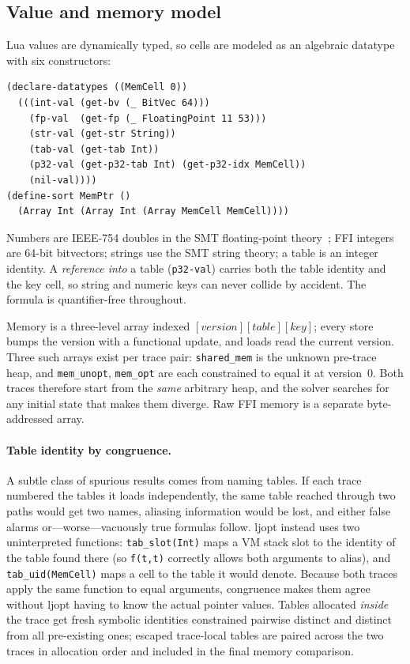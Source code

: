 \documentclass[runningheads]{llncs}
\newif\iffull \fulltrue
\newcommand{\ljopt}{\textsf{ljopt}}
\newcommand{\ir}[1]{\texttt{#1}}
\begin{document}
\subsection{Value and memory model}

Lua values are dynamically typed, so cells are modeled as an algebraic
datatype with six constructors:

\begin{lstlisting}[language=smtlib]
(declare-datatypes ((MemCell 0))
  (((int-val (get-bv (_ BitVec 64)))
    (fp-val  (get-fp (_ FloatingPoint 11 53)))
    (str-val (get-str String))
    (tab-val (get-tab Int))
    (p32-val (get-p32-tab Int) (get-p32-idx MemCell))
    (nil-val))))
(define-sort MemPtr ()
  (Array Int (Array Int (Array MemCell MemCell))))
\end{lstlisting}

\noindent
Numbers are IEEE-754 doubles in the SMT floating-point
theory~\cite{sheridan2007ieee754}; FFI integers are 64-bit bitvectors;
strings use the SMT string theory; a table is an integer identity. A
\emph{reference into} a table (\ir{p32-val}) carries both the table identity
and the key cell, so string and numeric keys can never collide by accident.
The formula is quantifier-free throughout.

Memory is a three-level array indexed
$[\mathit{version}][\mathit{table}][\mathit{key}]$; every store bumps the
version with a functional update, and loads read the current version. Three
such arrays exist per trace pair: \texttt{shared\_mem} is the unknown
pre-trace heap, and \texttt{mem\_unopt}, \texttt{mem\_opt} are each
constrained to equal it at version~0. Both traces therefore start from the
\emph{same} arbitrary heap, and the solver searches for any initial state
that makes them diverge. Raw FFI memory is a separate byte-addressed array.

\iffull
\paragraph{Table identity by congruence.}
A subtle class of spurious results comes from naming tables. If each trace
numbered the tables it loads independently, the same table reached through
two paths would get two names, aliasing information would be lost, and
either false alarms or---worse---vacuously true formulas follow. \ljopt{}
instead uses two uninterpreted functions: \texttt{tab\_slot(Int)} maps a VM
stack slot to the identity of the table found there (so \texttt{f(t,t)}
correctly allows both arguments to alias), and \texttt{tab\_uid(MemCell)}
maps a cell to the table it would denote. Because both traces apply the same
function to equal arguments, congruence makes them agree without \ljopt{}
having to know the actual pointer values. Tables allocated \emph{inside}
the trace get fresh symbolic identities constrained pairwise distinct and
distinct from all pre-existing ones; escaped trace-local tables are paired
across the two traces in allocation order and included in the final memory
comparison.
\fi %
\end{document}
